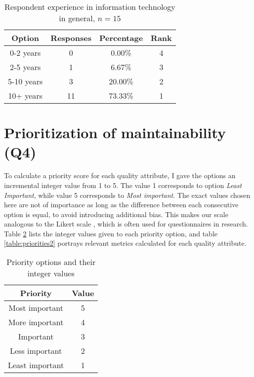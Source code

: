 \documentclass[utf8,english]{gradu3}
\begin{document}
\begin{table}[!h]
  \begin{center}
    \caption{Respondent experience in information technology in general, $n = 15$}
    \label{table:experience-it}
    \begin{tabular}{|c|c|c|c|}
      \hline
      \textbf{Option} & \textbf{Responses} & \textbf{Percentage} & \textbf{Rank} \\
      \hline
      0-2 years       & 0                  & 0.00\%              & 4             \\
      2-5 years       & 1                  & 6.67\%              & 3             \\
      5-10 years      & 3                  & 20.00\%             & 2             \\
      10+ years       & 11                 & 73.33\%             & 1             \\
      \hline
    \end{tabular}
  \end{center}
\end{table}

\section{Prioritization of maintainability (Q4)}

To calculate a priority score for each quality attribute, I gave the options an
incremental integer value from 1 to 5. The value 1 corresponds to option
\textit{Least Important}, while value 5 corresponds to \textit{Most important}.
The exact values chosen here are not of importance as long as the difference
between each consecutive option is equal, to avoid introducing additional
bias. This makes our scale analogous to the Likert scale \parencite{Likert}, which is
often used for questionnaires in research.
Table \ref{table:priorities1} lists the integer values given to each priority option,
and table \ref{table:priorities2} portrays relevant metrics calculated for each quality attribute.

\begin{table}[!h]
  \begin{center}
    \caption{Priority options and their integer values}
    \label{table:priorities1}
    \begin{tabular}{|c|c|}
      \hline
      \textbf{Priority} & \textbf{Value} \\
      \hline
      Most important    & 5              \\
      More important    & 4              \\
      Important         & 3              \\
      Less important    & 2              \\
      Least important   & 1              \\
      \hline
    \end{tabular}
  \end{center}
\end{table}
\end{document}
